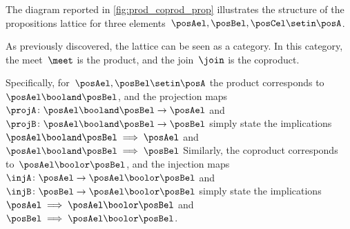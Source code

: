 The diagram reported in \cref{fig:prod_coprod_prop} illustrates the structure of the propositions lattice for three elements~$\posAel,\posBel,\posCel\setin \posA$.

As previously discovered, the lattice can be seen as a category.
In this category, the meet~$\meet$ is the product, and the join~$\join$ is the coproduct.

Specifically, for~$\posAel,\posBel\setin \posA$ the product corresponds to~$\posAel\booland \posBel$, and the projection maps~$\projA\colon \posAel\booland \posBel\to \posAel$ and~$\projB\colon \posAel\booland \posBel\to \posBel$ simply state the implications~$\posAel \booland \posBel \implies \posAel$ and~$\posAel \booland \posBel \implies \posBel$
Similarly, the coproduct corresponds to~$\posAel\boolor \posBel$, and the injection maps~$\injA\colon \posAel\to \posAel\boolor \posBel$ and~$\injB\colon \posBel\to \posAel\boolor \posBel$ simply state the implications~$\posAel \implies \posAel \boolor \posBel$ and~$\posBel \implies \posAel \boolor \posBel$.

